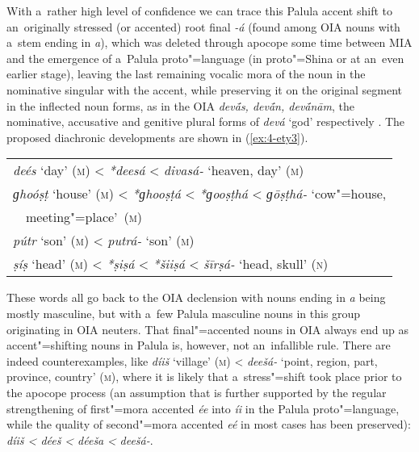 With a~rather high level of confidence we can trace this Palula accent shift to an~originally stressed (or accented) root final \textit{-á} (found among OIA nouns with a~stem ending in \textit{a}), which was deleted through apocope some time between MIA \citep[247--248]{pischel2011} and the emergence of a~Palula proto"=language (in proto"=Shina or at an~even earlier stage), leaving the last remaining vocalic mora of the noun in the nominative singular with the accent, while preserving it on the original segment in the inflected noun forms, as in the OIA \textit{dev\'{\={a}}s, dev\'{\={a}}n, dev\'{\={a}}nām}, the nominative, accusative and genitive plural forms of \textit{devá} `god' respectively \citep[330]{whitney1960}. The proposed diachronic developments are shown in (\ref{ex:4-ety3}). 

\begin{exe}
\extab
\label{ex:4-ety3}
\begin{tabular}{ l }
\textit{deés} `day' (\textsc{m}) {\textless} \textit{*deesá} {\textless} \textit{divasá-} `heaven, day' (\textsc{m})\\
\textit{ɡhoóṣṭ} `house' (\textsc{m}) {\textless} \textit{*ɡhooṣṭá} {\textless} \textit{*ɡooṣṭhá} {\textless} \textit{ɡōṣṭhá-} `cow"=house, \\
~~meeting"=place'~(\textsc{m})\\
\textit{pútr} `son' (\textsc{m}) {\textless} \textit{putrá-} `son' (\textsc{m})\\
\textit{ṣíṣ} `head' (\textsc{m}) {\textless} \textit{*ṣiṣá} {\textless} \textit{*šiiṣá} {\textless} \textit{šīrṣá-} `head, skull' (\textsc{n})
\end{tabular}
\end{exe}

These words all go back to the OIA declension with nouns ending in \textit{a} being mostly masculine, but with a~few Palula masculine nouns in this group originating in OIA neuters. That final"=accented nouns in OIA always end up as accent"=shifting nouns in Palula is, however, not an~infallible rule. There are indeed counterexamples, like \textit{díiš} `village' (\textsc{m}) {\textless} \textit{deešá-} `point, region, part, province, country' (\textsc{m}), where it is likely that a~stress"=shift took place prior to the apocope process (an assumption that is further supported by the regular strengthening of first"=mora accented \textit{ée} into \textit{íi} in the Palula proto"=language, while the quality of second"=mora accented \textit{eé} in most cases has been preserved): \textit{díiš {\textless} déeš} \textit{{\textless} déeša} \textit{{\textless}} \textit{deešá-}. 


